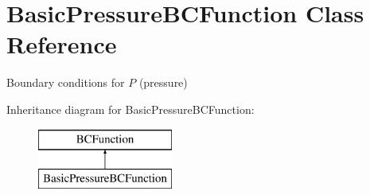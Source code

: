 \hypertarget{class_basic_pressure_b_c_function}{\section{Basic\-Pressure\-B\-C\-Function Class Reference}
\label{class_basic_pressure_b_c_function}
}


Boundary conditions for $P$ (pressure)  


Inheritance diagram for Basic\-Pressure\-B\-C\-Function\-:\begin{figure}[H]
\begin{center}
\leavevmode
\includegraphics[height=2.000000cm]{class_basic_pressure_b_c_function}
\end{center}
\end{figure}
